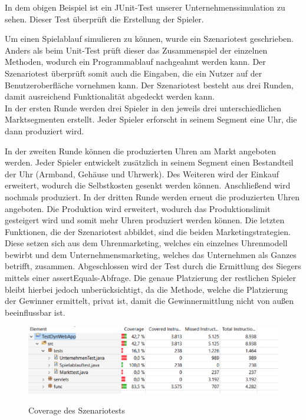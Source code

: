 In dem obigen Beispiel ist ein JUnit-Test unserer Unternehmenssimulation zu sehen. Dieser Test überprüft die Erstellung der Spieler.

Um einen Spielablauf simulieren zu können, wurde ein Szenariotest geschrieben. Anders als beim Unit-Test prüft dieser das Zusammenspiel der einzelnen Methoden, wodurch ein Programmablauf nachgeahmt werden kann. Der Szenariotest überprüft somit auch die Eingaben, die ein Nutzer auf der Benutzeroberfläche vornehmen kann.
Der Szenariotest besteht aus drei Runden, damit ausreichend Funktionalität abgedeckt werden kann. 
\\
In der ersten Runde werden drei Spieler in den jeweils drei unterschiedlichen Marktsegmenten erstellt. Jeder Spieler erforscht in seinem Segment eine Uhr, die dann produziert wird. \par
In der zweiten Runde können die produzierten Uhren am Markt angeboten werden. Jeder Spieler entwickelt zusätzlich in seinem Segment einen Bestandteil der Uhr (Armband, Gehäuse und Uhrwerk). Des Weiteren wird der Einkauf erweitert, wodurch die Selbstkosten gesenkt werden können. Anschließend wird nochmals produziert. 
In der dritten Runde werden erneut die produzierten Uhren angeboten. Die Produktion wird erweitert, wodurch das Produktionslimit gesteigert wird und somit mehr Uhren produziert werden können. Die letzten Funktionen, die der Szenariotest abbildet, sind die beiden Marketingstrategien. Diese setzen sich aus dem Uhrenmarketing, welches ein einzelnes Uhrenmodell bewirbt und dem Unternehmensmarketing, welches das Unternehmen als Ganzes betrifft, zusammen. 
Abgeschlossen wird der Test durch die Ermittlung des Siegers mittels einer assertEquals-Abfrage. Die genaue Platzierung der restlichen Spieler bleibt hierbei jedoch unberücksichtigt, da die Methode, welche die Platzierung der Gewinner ermittelt, privat ist, damit die Gewinnermittlung nicht von außen beeinflussbar ist. 

\begin{figure}[!h]
	\centering
	\includegraphics[scale=0.8]{img/bild1_tests.png} 
	\label{fig:abb}
	\caption{Coverage des Szenariotests}
\end{figure}

